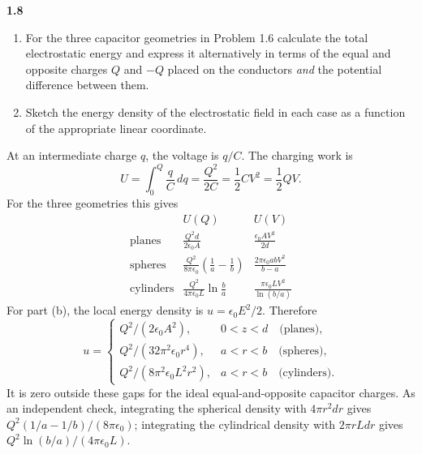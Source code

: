 \par\bigskip
\noindent\textbf{1.8}\quad\begin{enumerate}
\item[(a)] For the three capacitor geometries in Problem 1.6 calculate the total electrostatic energy and express it alternatively in terms of the equal and opposite charges $Q$ and $-Q$ placed on the conductors \emph{and} the potential difference between them.
\item[(b)] Sketch the energy density of the electrostatic field in each case as a function of the appropriate linear coordinate.
\end{enumerate}
\solution
At an intermediate charge $q$, the voltage is $q/C$. The charging work is
\[
U=\int_0^Q\frac qC\,dq=\frac{Q^2}{2C}=\frac12CV^2=\frac12QV.
\]
For the three geometries this gives
\[
\begin{array}{c|c|c}
 &U(Q)&U(V)\\\hline
\text{planes}&\displaystyle\frac{Q^2d}{2\epsilon_0A}
&\displaystyle\frac{\epsilon_0AV^2}{2d}\\[5pt]
\text{spheres}&\displaystyle\frac{Q^2}{8\pi\epsilon_0}\left(\frac1a-\frac1b\right)
&\displaystyle\frac{2\pi\epsilon_0abV^2}{b-a}\\[5pt]
\text{cylinders}&\displaystyle\frac{Q^2}{4\pi\epsilon_0L}\ln\frac ba
&\displaystyle\frac{\pi\epsilon_0LV^2}{\ln(b/a)}
\end{array}
\]
For part (b), the local energy density is $u=\epsilon_0E^2/2$. Therefore
\[
u=\begin{cases}
Q^2/(2\epsilon_0A^2),&0<z<d\quad\text{(planes)},\\
Q^2/(32\pi^2\epsilon_0r^4),&a<r<b\quad\text{(spheres)},\\
Q^2/(8\pi^2\epsilon_0L^2r^2),&a<r<b\quad\text{(cylinders)}.
\end{cases}
\]
It is zero outside these gaps for the ideal equal-and-opposite capacitor
charges. As an independent check, integrating the spherical density with
$4\pi r^2dr$ gives $Q^2(1/a-1/b)/(8\pi\epsilon_0)$; integrating the
cylindrical density with $2\pi rLdr$ gives $Q^2\ln(b/a)/(4\pi\epsilon_0L)$.
\begin{center}
\end{center}


